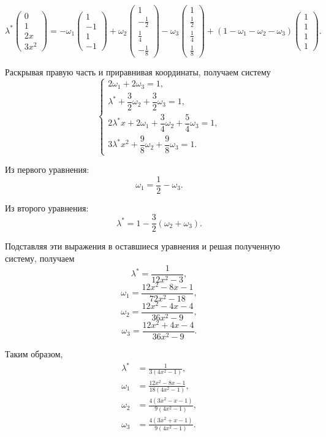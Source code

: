 \documentclass[12pt,a4paper]{article}
\begin{document}
	\[
	\lambda^*
	\begin{pmatrix}
		0\\
		1\\
		2x\\
		3x^2
	\end{pmatrix}
	=
	-\omega_1
	\begin{pmatrix}
		1\\
		-1\\
		1\\
		-1
	\end{pmatrix}
	+\omega_2
	\begin{pmatrix}
		1\\
		-\frac12\\
		\frac14\\
		-\frac18
	\end{pmatrix}
	-\omega_3
	\begin{pmatrix}
		1\\
		\frac12\\
		\frac14\\
		\frac18
	\end{pmatrix}
	+
	(1-\omega_1-\omega_2-\omega_3)
	\begin{pmatrix}
		1\\
		1\\
		1\\
		1
	\end{pmatrix}.
	\]
	
	Раскрывая правую часть и приравнивая координаты, получаем систему
	\[
	\begin{cases}
		2\omega_1+2\omega_3=1,\\[2mm]
		\lambda^*+\dfrac32\omega_2+\dfrac32\omega_3=1,\\[2mm]
		2\lambda^*x+2\omega_1+\dfrac34\omega_2+\dfrac54\omega_3=1,\\[2mm]
		3\lambda^*x^2+\dfrac98\omega_2+\dfrac98\omega_3=1.
	\end{cases}
	\]
	
	Из первого уравнения:
	\[
	\omega_1=\frac12-\omega_3.
	\]
	
	Из второго уравнения:
	\[
	\lambda^*=1-\frac32(\omega_2+\omega_3).
	\]
	
	Подставляя эти выражения в оставшиеся уравнения и решая полученную систему, получаем
	\[
	\lambda^*=\frac{1}{12x^2-3},
	\]
	\[
	\omega_1=
	\frac{12x^2-8x-1}{72x^2-18},
	\]
	\[
	\omega_2=
	\frac{12x^2-4x-4}{36x^2-9},
	\]
	\[
	\omega_3=
	\frac{12x^2+4x-4}{36x^2-9}.
	\]
	
	Таким образом,
	\[
	\boxed{
		\begin{aligned}
			\lambda^* &= \frac{1}{3(4x^2-1)},\\[2mm]
			\omega_1 &= \frac{12x^2-8x-1}{18(4x^2-1)},\\[2mm]
			\omega_2 &= \frac{4(3x^2-x-1)}{9(4x^2-1)},\\[2mm]
			\omega_3 &= \frac{4(3x^2+x-1)}{9(4x^2-1)}.
		\end{aligned}
	}
	\]
	
\end{document}
